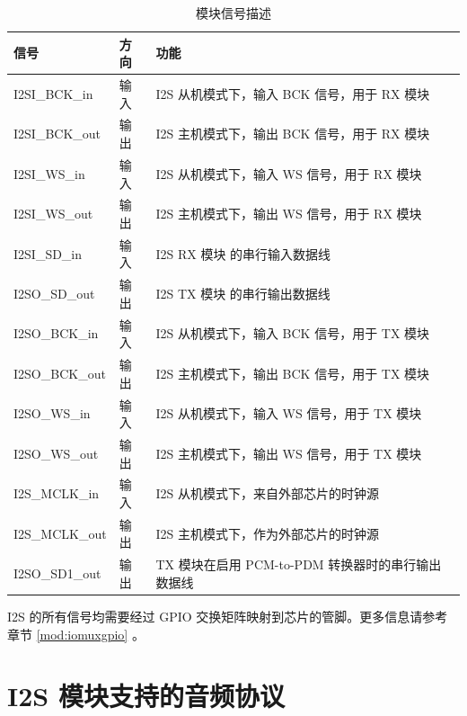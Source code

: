 \documentclass[main\_\_CN.tex]{subfiles}
\begin{document}
\begin{table}[H]
    \centering
    \caption{模块信号描述}
    \label{tab:i2s-signal-descr}
    \begin{threeparttable}
    \begin{tabular}{|p{3cm}|p{1.5cm}|p{8cm}| }
    \hline
    \rowcolor{lightgray}
    \textbf{信号}&\textbf{方向}&\textbf{功能}\\
    \hline
    I2SI\_BCK\_in & 输入 & I2S 从机模式下，输入 BCK 信号，用于 RX 模块\\
    \hline
    I2SI\_BCK\_out& 输出 & I2S 主机模式下，输出 BCK 信号，用于 RX 模块\\
    \hline
    I2SI\_WS\_in & 输入 & I2S 从机模式下，输入 WS 信号，用于 RX 模块\\
    \hline
    I2SI\_WS\_out& 输出 & I2S 主机模式下，输出 WS 信号，用于 RX 模块\\\hline
    I2SI\_SD\_in& 输入 & I2S RX 模块 的串行输入数据线\\\hline
    I2SO\_SD\_out& 输出 & I2S TX 模块 的串行输出数据线\\\hline
    I2SO\_BCK\_in& 输入 & I2S 从机模式下，输入 BCK 信号，用于 TX 模块 \\\hline
    I2SO\_BCK\_out& 输出 & I2S 主机模式下，输出 BCK 信号，用于 TX 模块 \\\hline
    I2SO\_WS\_in& 输入 & I2S 从机模式下，输入 WS 信号，用于 TX 模块\\\hline
    I2SO\_WS\_out& 输出 & I2S 主机模式下，输出 WS 信号，用于 TX 模块\\\hline
    I2S\_MCLK\_in& 输入 & I2S 从机模式下，来自外部芯片的时钟源\\\hline
    I2S\_MCLK\_out& 输出 & I2S 主机模式下，作为外部芯片的时钟源\\\hline
    I2SO\_SD1\_out& 输出 & TX 模块在启用 PCM-to-PDM 转换器时的串行输出数据线\\\hline
    \end{tabular}
    \begin{tablenotes}
        \item[*] I2S 的所有信号均需要经过 GPIO 交换矩阵映射到芯片的管脚。更多信息请参考章节 \ref{mod:iomuxgpio} \textit{}。
\end{tablenotes}
\end{threeparttable}
\end{table}


\section{I2S 模块支持的音频协议} \label{sec:i2s-supported-audio-standards}
\end{document}
